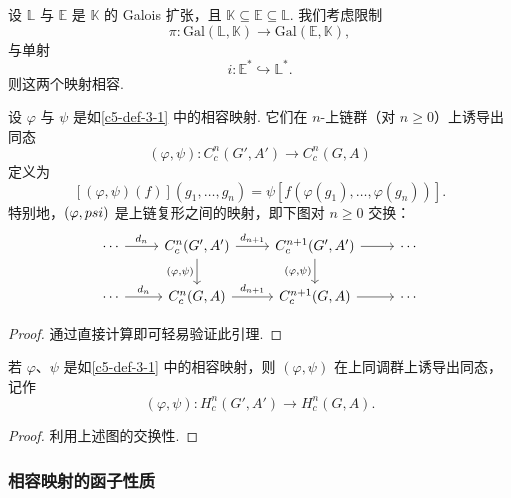 \begin{example}\label{c5-ex-3-2}
设 $\mathbb{L}$ 与 $\mathbb{E}$ 是 $\mathbb{K}$ 的 Galois 扩张，且 $\mathbb{K}\subseteq\mathbb{E}\subseteq\mathbb{L}$. 我们考虑限制
\[
\pi:\mathrm{Gal}(\mathbb{L},\mathbb{K})\to\mathrm{Gal}(\mathbb{E},\mathbb{K}),
\]
与单射
\[
i:\mathbb{E}^*\hookrightarrow\mathbb{L}^*.
\]
则这两个映射相容.
\end{example}

\begin{lemma}\label{c5-lem-3-1}
设 $\varphi$ 与 $\psi$ 是如\autoref{c5-def-3-1} 中的相容映射. 它们在 $n$-上链群（对 $n\geq 0$）上诱导出同态
\[
(\varphi,\psi):C^n_c(G',A')\to C^n_c(G,A)
\]
定义为
\[
[(\varphi,\psi)(f)](g_1,\ldots,g_n)=\psi[f(\varphi(g_1),\ldots,\varphi(g_n))].
\]
特别地，$(\varphi,\\psi)$ 是上链复形之间的映射，即下图对 $n\geq 0$ 交换：
\[
\begin{tikzcd}
\cdots \arrow[r, "d_n"] & C^n_c(G',A') \arrow[r, "d_{n+1}"] \arrow[d, "{(\varphi,\psi)}"'] & C^{n+1}_c(G',A') \arrow[d, "{(\varphi,\psi)}"'] \arrow[r] & \cdots \\
\cdots \arrow[r, "d_n"] & C^n_c(G,A) \arrow[r, "d_{n+1}"] & C^{n+1}_c(G,A) \arrow[r] & \cdots
\end{tikzcd}
\]
\end{lemma}

\begin{proof}
通过直接计算即可轻易验证此引理.
\end{proof}

\begin{corollary}\label{c5-cor-3-2}
若 $\varphi$、$\psi$ 是如\autoref{c5-def-3-1} 中的相容映射，则 $(\varphi,\psi)$ 在上同调群上诱导出同态，记作
\[
(\varphi,\psi):H^n_c(G',A')\to H^n_c(G,A).
\]
\end{corollary}

\begin{proof}
利用上述图的交换性.
\end{proof}

\subsubsection{相容映射的函子性质}


